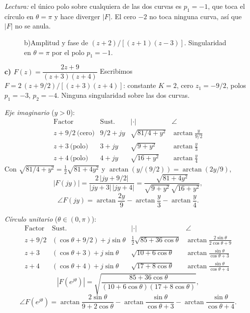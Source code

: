 \documentclass[10pt,a4paper]{article}
\begin{document}
\noindent\textit{Lectura:} el único polo sobre cualquiera de las dos curvas es $p_1=-1$, que toca el círculo en $\theta=\pi$ y hace diverger $|F|$. El cero $-2$ no toca ninguna curva, así que $|F|$ no se anula.

\begin{figure}[H]\centering
	
	\caption{b)\enspace Amplitud y fase de $(z+2)/[(z+1)(z-3)]$. Singularidad en $\theta=\pi$ por el polo $p_1=-1$.}
	\label{fig:resp16b}
\end{figure}

\bigskip

\noindent\textbf{c) $F(z)=\dfrac{2z+9}{(z+3)(z+4)}$}\;\textemdash\; Escribimos $F=2\,(z+9/2)/[(z+3)(z+4)]$: constante $K=2$, cero $z_1=-9/2$, polos $p_1=-3$, $p_2=-4$. Ninguna singularidad sobre las dos curvas.

\medskip
\noindent\textit{Eje imaginario} ($y>0$):
\[
	\renewcommand{\arraystretch}{1.3}
	\begin{array}{l|c|c|c}
	\text{Factor} & \text{Sust.} & |\cdot| & \angle \\\hline
	z+9/2\ \text{(cero)} & 9/2+jy & \sqrt{81/4+y^2} & \arctan\tfrac{y}{9/2} \\
	z+3\ \text{(polo)}   & 3+jy   & \sqrt{9+y^2}    & \arctan\tfrac{y}{3} \\
	z+4\ \text{(polo)}   & 4+jy   & \sqrt{16+y^2}   & \arctan\tfrac{y}{4}
	\end{array}
\]
Con $\sqrt{81/4+y^2}=\tfrac{1}{2}\sqrt{81+4y^2}$ y $\arctan(y/(9/2))=\arctan(2y/9)$,
\[
	|F(jy)| = \frac{2\,|jy+9/2|}{|jy+3|\,|jy+4|} = \frac{\sqrt{81+4y^2}}{\sqrt{9+y^2}\,\sqrt{16+y^2}},
\]
\[
	\angle F(jy) = \arctan\!\frac{2y}{9} - \arctan\!\frac{y}{3} - \arctan\!\frac{y}{4}.
\]

\medskip
\noindent\textit{Círculo unitario} ($\theta\in(0,\pi)$):
\[
	\renewcommand{\arraystretch}{1.3}
	\begin{array}{l|c|c|c}
	\text{Factor} & \text{Sust.} & |\cdot| & \angle \\\hline
	z+9/2 & (\cos\theta+9/2)+j\sin\theta & \tfrac{1}{2}\sqrt{85+36\cos\theta} & \arctan\tfrac{2\sin\theta}{2\cos\theta+9} \\
	z+3   & (\cos\theta+3)+j\sin\theta   & \sqrt{10+6\cos\theta}              & \arctan\tfrac{\sin\theta}{\cos\theta+3} \\
	z+4   & (\cos\theta+4)+j\sin\theta   & \sqrt{17+8\cos\theta}              & \arctan\tfrac{\sin\theta}{\cos\theta+4}
	\end{array}
\]
\[
	|F(e^{j\theta})| = \sqrt{\frac{85+36\cos\theta}{(10+6\cos\theta)(17+8\cos\theta)}},
\]
\[
	\angle F(e^{j\theta}) = \arctan\!\frac{2\sin\theta}{9+2\cos\theta} - \arctan\!\frac{\sin\theta}{\cos\theta+3} - \arctan\!\frac{\sin\theta}{\cos\theta+4}.
\]
\end{document}

